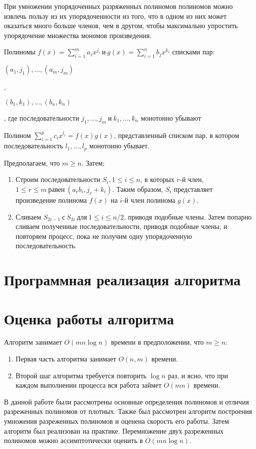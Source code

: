 \documentclass[bachelor, och, labwork]{shiza}
\begin{document}
При умножении упорядоченных разряженных полиномов полиномов можно извлечь пользу
из их упорядоченности из того, что в одном из них может оказаться много больше
членов, чем в другом, чтобы максимально упростить упорядочение множества мономов
произведения.

Полиномы $f(x)=\sum\limits_{i=1}^m{a_ix^{j_i}} ~\text{и}~ g(x)=\sum\limits_{i=1}^n{b_jx^{k_i}}$
списками пар: 
\begin{center} $(a_1,j_1),...,(a_m,j_m)$\end{center},
\begin{center} $(b_1,k_1),...,(b_n,k_n)$\end{center},
где последовательности $j_1,...,j_m ~\text{и}~ k_1,...,k_n$ монотонно убывают

Полином $\sum\limits_{i=1}^p{c_ix^{l_i}} = f(x)g(x)$, представленный списком пар,
в котором последовательность $l_1,...,l_p$ монотонно убывает.

Предполагаем, что $m \ge n$. Затем:
\begin{enumerate}
    
    \item Строим последовательности $S_i,1 \le i \le n$, в которых $r$-й член,
    $1 \le r \le m ~\text{равен}~ (a_rb_i, j_r + k_i)$. Таким образом, $S_i$
    представляет произведение полинома $f(x)$ на $i$-й член полинома $g(x)$.

    \item Сливаем $S_{2i-1} ~\text{с}~ S_{2i} ~\text{для}~ 1\le i \le n/2$,
          приводя подобные члены. Затем попарно сливаем полученные 
          последовательности, приводя подобные члены, и повторяем процесс, пока 
          не получим одну упорядоченную последовательность.

\end{enumerate}

\section{Программная реализация алгоритма}



\section{Оценка работы алгоритма}

Алгоритм занимает $O(mn\log n)$ времени в предположении, что $m \ge n$:
\begin{enumerate}
    \item Первая часть алгоритма занимает $O(n,m)$ времени.
    \item Второй шаг алгоритма требуется повторить $\log n$ раз, и ясно, что при
          каждом выполнении процесса вся работа займет $O(mn)$ времени.
\end{enumerate}

\conclusion

В данной работе были рассмотрены основные определения полиномов и отличия
разреженных полиномов от плотных. Также был рассмотрен алгоритм построения
умножения разреженных полиномов и оценена скорость его работы. Затем алгоритм 
был реализован на практике. Перемножение двух разреженных полиномов можно 
ассимптотически оценить в $O(mn\log n)$.
\end{document}

